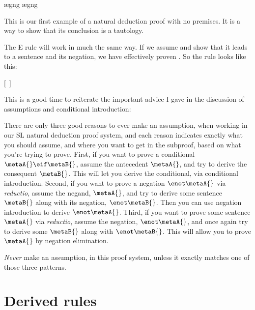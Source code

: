 \begin{ndproof}
	\open
		\ae{gng}
		\ae{gng}
	\close
\end{ndproof}

This is our first example of a natural deduction proof with no premises. It is a way to show that its conclusion is a tautology.

The {\enot}E rule will work in much the same way. If we assume \enot\metaA{} and show that it leads to a sentence and its negation, we have effectively proven \metaA{}. So the rule looks like this:

\begin{ndproof}
\open
	\metaB{}
\close
{}[\ ]\metaA{}
\end{ndproof}

This is a good time to reiterate the important advice I gave in the discussion of assumptions and conditional introduction: 


There are only three good reasons to ever make an assumption, when working in our SL natural deduction proof system, and each reason indicates exactly what you should assume, and where you want to get in the subproof, based on what you're trying to prove. First, if you want to prove a conditional $\metaA{}\eif\metaB{}$, assume the antecedent $\metaA{}$, and try to derive the consequent $\metaB{}$. This will let you derive the conditional, via conditional introduction. Second, if you want to prove a negation $\enot\metaA{}$ via \emph{reductio}, assume the negand, $\metaA{}$, and try to derive some sentence $\metaB{}$ along with its negation, $\enot\metaB{}$. Then you can use negation introduction to derive $\enot\metaA{}$. Third, if you want to prove some sentence $\metaA{}$ via \emph{reductio}, assume the negation, $\enot\metaA{}$, and once again try to derive some $\metaB{}$ along with $\enot\metaB{}$. This will allow you to prove $\metaA{}$ by negation elimination.

\emph{Never} make an assumption, in this proof system, unless it exactly matches one of those three patterns.

\section{Derived rules}


